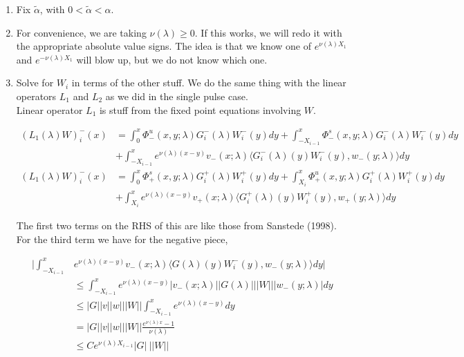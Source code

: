 \documentclass[12pt]{article}
\begin{document}
\begin{enumerate}

\item Fix $\tilde{\alpha}$, with $0 < \tilde{\alpha} < \alpha$. 

\item For convenience, we are taking $\nu(\lambda) \geq 0$. If this works, we will redo it with the appropriate absolute value signs. The idea is that we know one of $e^{\nu(\lambda) X_1}$ and $e^{-\nu(\lambda) X_1}$ will blow up, but we do not know which one.

\item Solve for $W_i$ in terms of the other stuff. We do the same thing with the linear operators $L_1$ and $L_2$ as we did in the single pulse case.\\

Linear operator $L_1$ is stuff from the fixed point equations involving $W$.

\begin{align*}
(L_1(\lambda)W)_i^-(x) &= \int_0^x \Phi^u_-(x, y; \lambda) G_i^-(\lambda)W_i^-(y) dy + \int_{-X_{i-1}}^x \Phi^s_-(x, y; \lambda) G_i^-(\lambda)W_i^-(y) dy \\
&+ \int_{-X_{i-1}}^x 
e^{\nu(\lambda)(x-y)} v_-(x; \lambda) \langle G_i^-(\lambda)(y)W_i^-(y), w_-(y; \lambda) \rangle dy \\
(L_1(\lambda)W)_i^-(x) &= \int_0^x \Phi^s_+(x, y; \lambda) G_i^+(\lambda)W_i^+(y) dy + \int_{X_i}^x \Phi^u_+(x, y; \lambda) G_i^+(\lambda) W_i^+(y) dy \\
&+ \int_{X_i}^x e^{\nu(\lambda)(x-y)} v_+(x; \lambda) \langle G_i^+(\lambda)(y)W_i^+(y), w_+(y; \lambda) \rangle dy
\end{align*}

The first two terms on the RHS of this are like those from Sanstede (1998). For the third term we have for the negative piece,

\begin{align*}
\Big| \int_{-X_{i-1}}^x &e^{\nu(\lambda)(x-y)} v_-(x; \lambda) \langle G(\lambda)(y)W_i^-(y), w_-(y; \lambda) \rangle dy \Big| \\
&\leq \int_{-X_{i-1}}^x e^{\nu(\lambda)(x-y)} |v_-(x; \lambda)| |G(\lambda)|||W|||w_-(y; \lambda)|dy \\
&\leq |G||v||w|||W|| \int_{-X_{i-1}}^x e^{\nu(\lambda)(x-y)} dy \\
&= |G||v||w|||W|| \frac{e^{\nu(\lambda)x} - 1}{\nu(\lambda)} \\
&\leq C e^{\nu(\lambda)X_{i-1}} |G| \: ||W||
\end{align*}


\end{enumerate}
\end{document}

